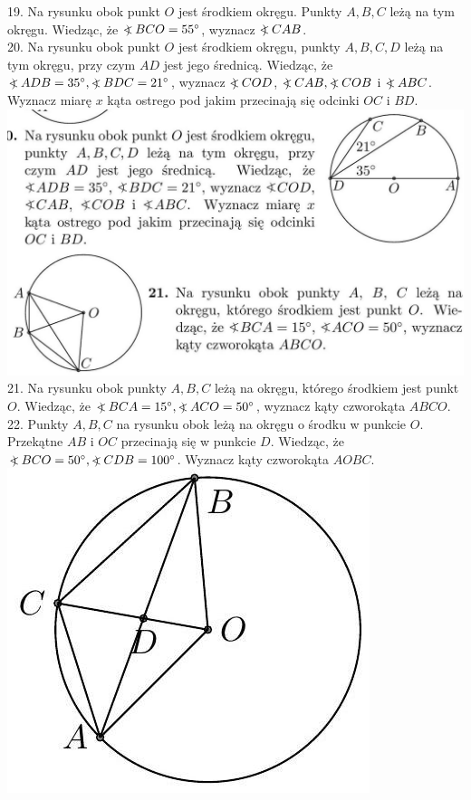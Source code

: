 \documentclass[10pt]{article}
\newcommand\Varangle{\mathop{{<\!\!\!\!\!\text{\small)}}\:}\nolimits}
\begin{document}
19. Na rysunku obok punkt \(O\) jest środkiem okręgu. Punkty \(A, B, C\) leżą na tym okręgu. Wiedząc, że \(\Varangle B C O=55^{\circ}\), wyznacz \(\Varangle C A B\).\\
20. Na rysunku obok punkt \(O\) jest środkiem okręgu, punkty \(A, B, C, D\) leżą na tym okręgu, przy czym \(A D\) jest jego średnicą. Wiedząc, że \(\Varangle A D B=35^{\circ}, \Varangle B D C=21^{\circ}\), wyznacz \(\Varangle C O D\), \(\Varangle C A B, \Varangle C O B\) i \(\Varangle A B C\). Wyznacz miarę \(x\) kąta ostrego pod jakim przecinają się odcinki \(O C\) i \(B D\).\\
\includegraphics[max width=\textwidth, center]{2024_11_21_71f62bd117d375398909g-185(2)}\\
21. Na rysunku obok punkty \(A, B, C\) leżą na okręgu, którego środkiem jest punkt \(O\). Wiedząc, że \(\Varangle B C A=15^{\circ}, \Varangle A C O=50^{\circ}\), wyznacz kąty czworokąta \(A B C O\).\\
22. Punkty \(A, B, C\) na rysunku obok leżą na okręgu o środku w punkcie \(O\). Przekątne \(A B\) i \(O C\) przecinają się w punkcie \(D\). Wiedząc, że \(\Varangle B C O=50^{\circ}, \Varangle C D B=100^{\circ}\). Wyznacz kąty czworokąta \(A O B C\).\\
\includegraphics[max width=\textwidth, center]{2024_11_21_71f62bd117d375398909g-185}\\
\end{document}
